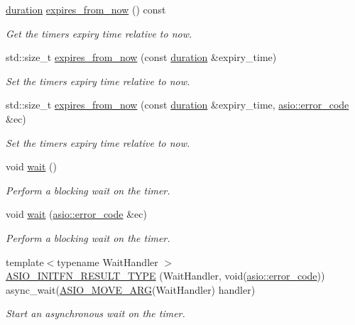 \begin{DoxyCompactItemize}
\hyperlink{classasio_1_1basic__waitable__timer_a3ab0ae5bdf928106cd6ea19fcd4f5d49}{duration} \hyperlink{classasio_1_1basic__waitable__timer_afc1cfc8ac6584ae28d69f790a8fe0e73}{expires\+\_\+from\+\_\+now} () const 
\begin{DoxyCompactList}\small\item\em Get the timer\textquotesingle{}s expiry time relative to now. \end{DoxyCompactList}\item 
std\+::size\+\_\+t \hyperlink{classasio_1_1basic__waitable__timer_aba5cfeb6574f5a1c22444db45dd5fdb2}{expires\+\_\+from\+\_\+now} (const \hyperlink{classasio_1_1basic__waitable__timer_a3ab0ae5bdf928106cd6ea19fcd4f5d49}{duration} \&expiry\+\_\+time)
\begin{DoxyCompactList}\small\item\em Set the timer\textquotesingle{}s expiry time relative to now. \end{DoxyCompactList}\item 
std\+::size\+\_\+t \hyperlink{classasio_1_1basic__waitable__timer_af456a9a924c173765a9e52bea96b7765}{expires\+\_\+from\+\_\+now} (const \hyperlink{classasio_1_1basic__waitable__timer_a3ab0ae5bdf928106cd6ea19fcd4f5d49}{duration} \&expiry\+\_\+time, \hyperlink{classasio_1_1error__code}{asio\+::error\+\_\+code} \&ec)
\begin{DoxyCompactList}\small\item\em Set the timer\textquotesingle{}s expiry time relative to now. \end{DoxyCompactList}\item 
void \hyperlink{classasio_1_1basic__waitable__timer_a2938c36fcd50c544ca290372785cf66e}{wait} ()
\begin{DoxyCompactList}\small\item\em Perform a blocking wait on the timer. \end{DoxyCompactList}\item 
void \hyperlink{classasio_1_1basic__waitable__timer_a6ec816ab7848e54beec480e2570e3e89}{wait} (\hyperlink{classasio_1_1error__code}{asio\+::error\+\_\+code} \&ec)
\begin{DoxyCompactList}\small\item\em Perform a blocking wait on the timer. \end{DoxyCompactList}\item 
{\footnotesize template$<$typename Wait\+Handler $>$ }\\\hyperlink{classasio_1_1basic__waitable__timer_a600bac1095794a65af9b5092c2ecacf8}{A\+S\+I\+O\+\_\+\+I\+N\+I\+T\+F\+N\+\_\+\+R\+E\+S\+U\+L\+T\+\_\+\+T\+Y\+P\+E} (Wait\+Handler, void(\hyperlink{classasio_1_1error__code}{asio\+::error\+\_\+code})) async\+\_\+wait(\hyperlink{group__async__read_ga6d72a97784dde9476c6d93b8904a4967}{A\+S\+I\+O\+\_\+\+M\+O\+V\+E\+\_\+\+A\+R\+G}(Wait\+Handler) handler)
\begin{DoxyCompactList}\small\item\em Start an asynchronous wait on the timer. \end{DoxyCompactList}\end{DoxyCompactItemize}
